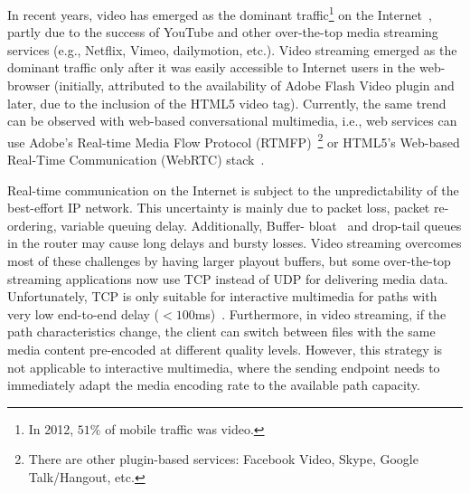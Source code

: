 In recent years, video has emerged as the dominant traffic\footnote{In 2012,
$51\%$ of mobile traffic was video.} on the Internet~\cite{cvni.13,dawn.zb},
partly due to the success of YouTube and other over-the-top media streaming
services (e.g., Netflix, Vimeo, dailymotion, etc.). Video streaming emerged as
the dominant traffic only after it was easily accessible to Internet users in
the web-browser (initially, attributed to the availability of Adobe Flash
Video plugin and later, due to the inclusion of the HTML5 video tag).
Currently, the same trend can be observed with web-based conversational
multimedia, i.e., web services can use Adobe's Real-time Media Flow Protocol
(RTMFP)~\cite{draft.rtmfp}\footnote{There are other plugin-based services:
Facebook Video, Skype, Google Talk/Hangout, etc.} or HTML5's Web-based
Real-Time Communication (WebRTC) stack~\cite{draft.webrtc}.


Real-time communication on the Internet is subject to the unpredictability of
the best-effort IP network. This uncertainty is mainly due to packet loss,
packet re-ordering, variable queuing delay. Additionally, Buffer-%
bloat~\cite{gettys:bufferbloat} and drop-tail queues in the router may cause
long delays and bursty losses. Video streaming overcomes most of these
challenges by having larger playout buffers, but some over-the-top streaming
applications now use TCP instead of UDP for delivering media data.
Unfortunately, TCP is only suitable for interactive multimedia for paths with
very low end-to-end delay ($<100$ms)~\cite{Brosh:tcp-real-time}. Furthermore,
in video streaming, if the path characteristics change, the client can switch
between files with the same media content pre-encoded at different quality
levels. However, this strategy is not applicable to interactive multimedia,
where the sending endpoint needs to immediately adapt the media encoding rate
to the available path capacity.



